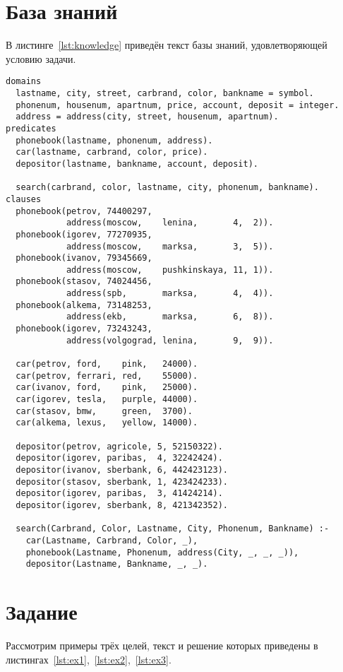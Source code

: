 \section{База знаний}

В листинге~\ref{lst:knowledge} приведён текст базы знаний, удовлетворяющей условию задачи.
\begin{lstlisting}[caption={База знаний},label={lst:knowledge}]
domains
  lastname, city, street, carbrand, color, bankname = symbol.
  phonenum, housenum, apartnum, price, account, deposit = integer.
  address = address(city, street, housenum, apartnum).
predicates
  phonebook(lastname, phonenum, address).
  car(lastname, carbrand, color, price).
  depositor(lastname, bankname, account, deposit).

  search(carbrand, color, lastname, city, phonenum, bankname).
clauses
  phonebook(petrov, 74400297,
            address(moscow,    lenina,       4,  2)).
  phonebook(igorev, 77270935,
            address(moscow,    marksa,       3,  5)).
  phonebook(ivanov, 79345669,
            address(moscow,    pushkinskaya, 11, 1)).
  phonebook(stasov, 74024456,
            address(spb,       marksa,       4,  4)).
  phonebook(alkema, 73148253,
            address(ekb,       marksa,       6,  8)).
  phonebook(igorev, 73243243,
            address(volgograd, lenina,       9,  9)).

  car(petrov, ford,    pink,   24000).
  car(petrov, ferrari, red,    55000).
  car(ivanov, ford,    pink,   25000).
  car(igorev, tesla,   purple, 44000).
  car(stasov, bmw,     green,  3700).
  car(alkema, lexus,   yellow, 14000).

  depositor(petrov, agricole, 5, 52150322).
  depositor(igorev, paribas,  4, 32242424).
  depositor(ivanov, sberbank, 6, 442423123).
  depositor(stasov, sberbank, 1, 423424233).
  depositor(igorev, paribas,  3, 41424214).
  depositor(igorev, sberbank, 8, 421342352).

  search(Carbrand, Color, Lastname, City, Phonenum, Bankname) :-
    car(Lastname, Carbrand, Color, _),
    phonebook(Lastname, Phonenum, address(City, _, _, _)),
    depositor(Lastname, Bankname, _, _).
\end{lstlisting}

\section{Задание }
Рассмотрим примеры трёх целей, текст и решение которых приведены в листингах~\ref{lst:ex1},~\ref{lst:ex2},~\ref{lst:ex3}.

